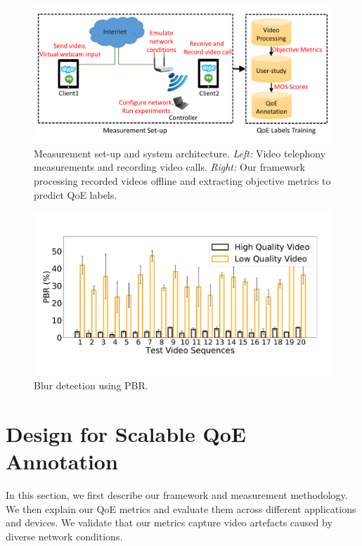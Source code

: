 \begin{figure}[t]
  \centering
  \includegraphics[width=\linewidth]{sections/network-work/setup}
     \vspace{-0.3in}
    \caption{Measurement set-up and system architecture. \textit{Left:} Video telephony measurements and recording video calls. \textit{Right:} Our framework processing recorded videos offline and extracting objective metrics to predict QoE labels.}
   \vspace{-0.2in}
  \label{fig:set-up}
\end{figure}
\begin{figure}[t]
  \centering
  \includegraphics[width=\linewidth]{sections/network-work/bar-pbr}
   \vspace{-0.5in}
  \caption{Blur detection using PBR.}
\vspace{-2em}
  \label{fig:ourblurdetection}
\end{figure}

\section{Design for Scalable QoE Annotation} \label{label:design}
In this section, we first describe our framework and measurement methodology. 
We then explain our QoE metrics and evaluate them across different applications and devices. We validate that our metrics capture video artefacts caused by diverse network conditions.

